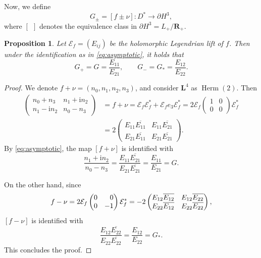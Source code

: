 \documentclass[a4paper]{amsart}
\theoremstyle{plain}
\newtheorem{proposition}[theorem]{Proposition}
\theoremstyle{remark}
\numberwithin{equation}{section}
\begin{document}
Now, we define
\begin{equation*}
  G_{\pm} = [f\pm\nu]\colon{}D^* \longrightarrow \partial H^3,
\end{equation*}
where $[~~]$ denotes the equivalence class in $\partial H^3=L_+/{\boldsymbol{R}}_+$.
\begin{proposition}\label{prop:lightcone-g}
 Let ${\mathcal{E}}_f=(E_{ij})$ be the holomorphic Legendrian lift of $f$.  Then
 under the identification as in \eqref{eq:asymptotic}, it holds that
 \[
    G_+=G = \frac{E_{11}}{E_{21}},\qquad G_{-}=G_*=\frac{E_{12}}{E_{22}}.
 \]
\end{proposition}
\begin{proof}
 We denote $f+\nu=(n_0,n_1,n_2,n_3)$, and 
 consider ${\boldsymbol{L}}^4$ as ${\operatorname{Herm}}(2)$.
 Then  
 \begin{align*}
    \begin{pmatrix}
         n_0 + n_3 & n_1 + {\mathrm{i}} n_2 \\
         n_1- {\mathrm{i}} n_2 & n_0 -  n_3
    \end{pmatrix} &=
     f+\nu =
     {\mathcal{E}}_f{\mathcal{E}}_f^* + {\mathcal{E}}_fe_3{\mathcal{E}}_f^* =
     2 {\mathcal{E}}_f \begin{pmatrix}1 & 0 \\ 0 & 0 \end{pmatrix}{\mathcal{E}}_f^*\\
    &=
      2\begin{pmatrix}
	  E_{11}\overline{E_{11}} & E_{11}\overline{E_{21}} \\
	  E_{21}\overline{E_{11}} & E_{21}\overline{E_{21}}
       \end{pmatrix}.
 \end{align*}
 By \eqref{eq:asymptotic}, 
 the map
 $[f+\nu]$ is identified with
 \[
      \frac{n_1+ {\mathrm{i}} n_2}{n_0-n_3}=
      \frac{E_{11}\overline{E_{21}}}{E_{21}\overline{E_{21}}}
         =\frac{E_{11}}{E_{21}}=G.
 \]

 On the other hand, since
 \[
  f-\nu  = 2  {\mathcal{E}}_f\begin{pmatrix} 0 & \hphantom{-}0 \\
		    0 &   -1\end{pmatrix} {\mathcal{E}}_f^*
               =-2\begin{pmatrix}
		   E_{12}\overline{E_{12}}  & E_{12}\overline{E_{22}} \\
		   E_{22}\overline{E_{12}} &  E_{22}\overline{E_{22}}
		  \end{pmatrix},
 \]
 $[f-\nu]$ is identified with
 \[
    \frac{E_{12}\overline{E_{22}}}{E_{22}\overline{E_{22}}}=
    \frac{E_{12}}{E_{22}}=G_*.
 \]
 This concludes the proof.  
\end{proof}
\end{document}
